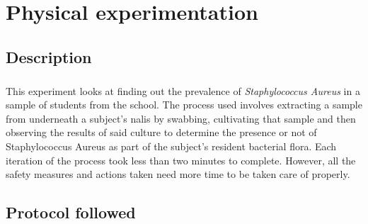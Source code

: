 \chapter{Physical experimentation}
\section{Description}
\paragraph{}This experiment looks at finding out the prevalence of \emph{Staphylococcus Aureus} in a sample of students from the school. The process used involves extracting a sample from underneath a subject's nalis by swabbing, cultivating that sample and then observing the results of said culture to determine the presence or not of Staphylococcus Aureus as part of the subject's resident bacterial flora. Each iteration of the process took less than two minutes to complete. However, all the safety measures and actions taken need more time to be taken care of properly. 
\section{Protocol followed}

